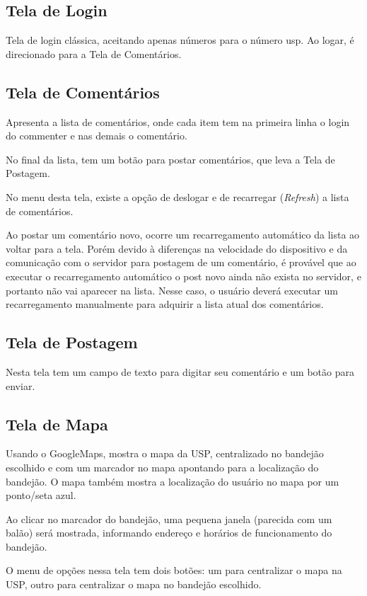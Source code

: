 \subsection{Tela de Login}
Tela de login clássica, aceitando apenas números para o número usp. Ao logar, é direcionado para a Tela de Comentários.

\subsection{Tela de Comentários}
Apresenta a lista de comentários, onde cada item tem na primeira linha o login do commenter e nas demais o comentário.

No final da lista, tem um botão para postar comentários, que leva a Tela de Postagem.

No menu desta tela, existe a opção de deslogar e de recarregar (\textit{Refresh}) a lista de comentários. 

Ao postar um comentário novo, ocorre um recarregamento automático da lista ao voltar para a tela. Porém devido à diferenças na velocidade do dispositivo e da comunicação
com o servidor para postagem de um comentário, é provável que ao executar o recarregamento automático o post novo ainda não exista no servidor, e portanto não vai aparecer na lista.
Nesse caso, o usuário deverá executar um recarregamento manualmente para adquirir a lista atual dos comentários.

\subsection{Tela de Postagem}
Nesta tela tem um campo de texto para digitar seu comentário e um botão para enviar.

\subsection{Tela de Mapa}
Usando o GoogleMaps, mostra o mapa da USP, centralizado no bandejão escolhido e com um marcador no mapa apontando para a localização do bandejão.
O mapa também mostra a localização do usuário no mapa por um ponto/seta azul.

Ao clicar no marcador do bandejão, uma pequena janela (parecida com um balão) será mostrada, informando endereço e horários de funcionamento do bandejão.

O menu de opções nessa tela tem dois botões: um para centralizar o mapa na USP, outro para centralizar o mapa no bandejão escolhido.

